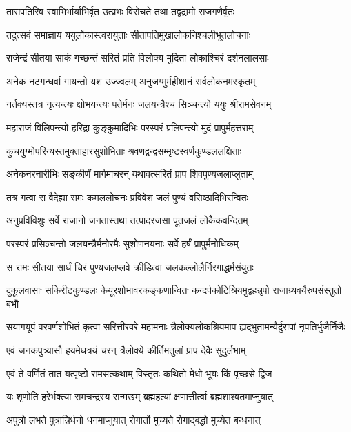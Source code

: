 \twolineshloka
{तारापतिरिव स्वाभिर्भार्याभिर्वृत उत्प्रभः}
{विरोचते तथा तद्वद्रामो राजगणैर्वृतः}%

\twolineshloka
{तदुत्सवं समाज्ञाय ययुर्लोकास्त्वरायुताः}
{सीतापतिमुखालोकनिश्चलीभूतलोचनाः}%

\twolineshloka
{राजेन्द्रं सीतया साकं गच्छन्तं सरितं प्रति}
{विलोक्य मुदिता लोकाश्चिरं दर्शनलालसाः}%

\twolineshloka
{अनेक नटगन्धर्वा गायन्तो यश उज्ज्वलम्}
{अनुजग्मुर्महीशानं सर्वलोकनमस्कृतम्}%

\twolineshloka
{नर्तक्यस्तत्र नृत्यन्त्यः क्षोभयन्त्यः पतेर्मनः}
{जलयन्त्रैश्च सिञ्चन्त्यो ययुः श्रीरामसेवनम्}%

\twolineshloka
{महाराजं विलिपन्त्यो हरिद्रा कुङ्कुमादिभिः}
{परस्परं प्रलिपन्त्यो मुदं प्रापुर्महत्तराम्}%

\twolineshloka
{कुचयुग्मोपरिन्यस्तमुक्ताहारसुशोभिताः}
{श्रवणद्वन्द्वसम्मृष्टस्वर्णकुण्डललक्षिताः}%

\twolineshloka
{अनेकनरनारीभिः सङ्कीर्णं मार्गमाचरन्}
{यथावत्सरितं प्राप शिवपुण्यजलाप्लुताम्}%

\twolineshloka
{तत्र गत्वा स वैदेह्या रामः कमललोचनः}
{प्रविवेश जलं पुण्यं वसिष्ठादिभिरन्वितः}%

\twolineshloka
{अनुप्रविविशुः सर्वे राजानो जनतास्तथा}
{तत्पादरजसा पूतजलं लोकैकवन्दितम्}%

\twolineshloka
{परस्परं प्रसिञ्चन्तो जलयन्त्रैर्मनोरमैः}
{सुशोणनयनाः सर्वे हर्षं प्रापुर्मनोधिकम्}%

\twolineshloka
{स रामः सीतया सार्धं चिरं पुण्यजलप्लवे}
{क्रीडित्वा जलकल्लोलैर्निरगाद्धर्मसंयुतः}%

\twolineshloka
{दुकूलवासाः सकिरीटकुण्डलः केयूरशोभावरकङ्कणान्वितः}
{कन्दर्पकोटिश्रियमुद्वहन्नृपो राजाग्र्यवर्यैरुपसंस्तुतो बभौ}%

\twolineshloka
{सयागयूपं वरवर्णशोभितं कृत्वा सरित्तीरवरे महामनाः}
{त्रैलोक्यलोकश्रियमाप ह्यद्भुतामन्यैर्दुरापां नृपतिर्भुजैर्निजैः}%

\twolineshloka
{एवं जनकपुत्र्यासौ हयमेधत्रयं चरन्}
{त्रैलोक्ये कीर्तिमतुलां प्राप देवैः सुदुर्लभाम्}%

\twolineshloka
{एवं ते वर्णितं तात यत्पृष्टो रामसत्कथाम्}
{विस्तृतः कथितो मेधो भूयः किं पृच्छसे द्विज}%

\twolineshloka
{यः शृणोति हरेर्भक्त्या रामचन्द्रस्य सन्मखम्}
{ब्रह्महत्यां क्षणात्तीर्त्वा ब्रह्मशाश्वतमाप्नुयात्}%

\twolineshloka
{अपुत्रो लभते पुत्रान्निर्धनो धनमाप्नुयात्}
{रोगार्तो मुच्यते रोगाद्बद्धो मुच्येत बन्धनात्}%

